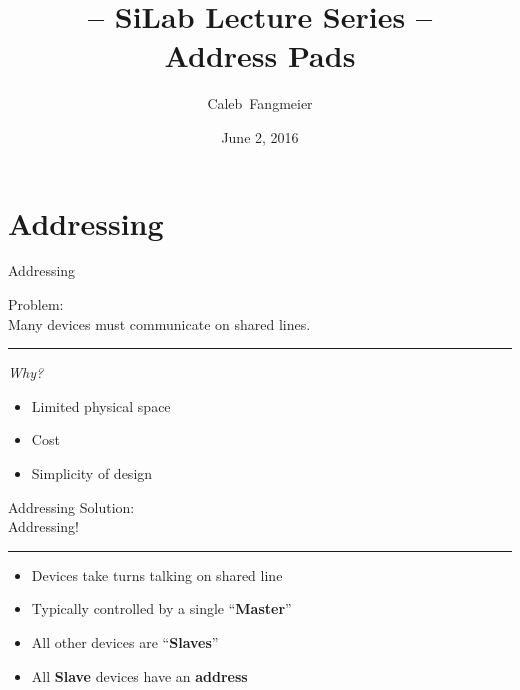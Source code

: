 \documentclass{beamer}
\title[\textbf{Address Pads}]{-- SiLab Lecture Series -- \\ \textbf{Address Pads}}
\author{Caleb~Fangmeier}
\institute[UNL]{University of Nebraska - Lincoln}
\date{June 2, 2016}
\begin{document}
\begin{frame}
  \titlepage
\end{frame}

\section{Addressing}
\begin{frame}{Addressing}
    \begin{center}
    \alert{Problem}: \\ Many devices must communicate on shared lines.
    \pause
    \vspace{.15in}\hrule
    \end{center}
    \emph{Why?}
    \begin{itemize}
        \pause \item Limited physical space
        \pause \item Cost
        \pause \item Simplicity of design
    \end{itemize}
\end{frame}

\begin{frame}{Addressing}
    \centering
    \alert{Solution}: \\ Addressing!
    \pause 
    \vspace{.15in}\hrule
    \begin{itemize}
        \item Devices take turns talking on shared line
        \pause \item Typically controlled by a single ``\textbf{Master}''
        \pause \item All other devices are ``\textbf{Slaves}''
        \pause \item All \textbf{Slave} devices have an \textbf{address}
    \end{itemize}
\end{frame}
\end{document}
